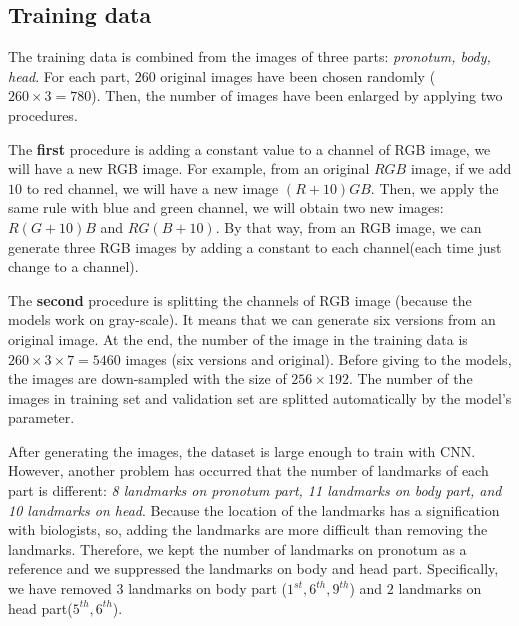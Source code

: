 \documentclass[12pt,a4paper]{article}
\begin{document}
\subsection{Training data}
The training data is combined from the images of three parts: \textit{pronotum, body, head}. For each part, $260$ original images have been chosen randomly ($260 \times 3 = 780$). Then, the number of images have been enlarged by applying two procedures. 

The \textbf{first} procedure is adding a constant value to a channel of RGB image, we will have a new RGB image. For example, from an original $RGB$ image, if we add $10$ to red channel, we will have a new image $(R+10)GB$. Then, we apply the same rule with blue and green channel, we will obtain two new images: $R(G+10)B$ and $RG(B+10)$. By that way, from an RGB image, we can generate three RGB images by adding a constant to each channel(each time just change to a channel). 

The \textbf{second} procedure is splitting the channels of RGB image (because the models work on gray-scale). It means that we can generate six versions from an original image. At the end, the number of the image in the training data is $ 260 \times 3 \times 7 = 5460$ images (six versions and original). Before giving to the models, the images are down-sampled with the size of $256 \times 192$. The number of the images in training set and validation set are splitted automatically by the model's parameter.

After generating the images, the dataset is large enough to train with CNN. However, another problem has occurred that the number of landmarks of each part is different: \textit{8 landmarks on pronotum part, 11 landmarks on body part, and 10 landmarks on head}. Because the location of the landmarks has a signification with biologists, so, adding the landmarks are more difficult than removing the landmarks. Therefore, we kept the number of landmarks on pronotum as a reference and we suppressed the landmarks on body and head part. Specifically, we have removed $3$ landmarks on body part ($1^{st}, 6^{th}, 9^{th}$) and $2$ landmarks on head part($5^{th}, 6^{th}$).
\end{document}
